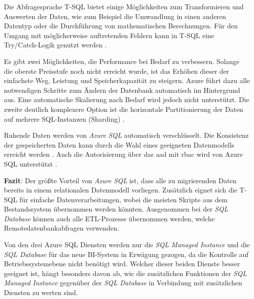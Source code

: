 Die Abfragesprache T-SQL bietet einige Möglichkeiten zum Transformieren und Auswerten der Daten, wie zum Beispiel die Umwandlung in einen anderen Datentyp oder die Durchführung von mathematischen Berechnungen. Für den Umgang mit möglicherweise auftretenden Fehlern kann in T-SQL eine Try/Catch-Logik genutzt werden \cite[vgl.][]{kellenberger_beginning_2021}.

Es gibt zwei Möglichkeiten, die Performance bei Bedarf zu verbessern. Solange die oberste Preisstufe noch nicht erreicht wurde, ist das Erhöhen dieser der einfachste Weg, Leistung und Speicherkapazität zu steigern. Azure führt dazu alle notwendigen Schritte zum Ändern der Datenbank automatisch im Hintergrund aus. Eine automatische Skalierung nach Bedarf wird jedoch nicht unterstützt. Die zweite deutlich komplexere Option ist die horizontale Partitionierung der Daten auf mehrere SQL-Instanzen (Sharding) \cite{reagan_web_2018}.

Ruhende Daten werden von \textit{Azure SQL} automatisch verschlüsselt. Die Konsistenz der gespeicherten Daten kann durch die Wahl eines geeigneten Datenmodells erreicht werden \cite{reagan_web_2018}. Auch die Autorisierung über das \ac{aad} mit \ac{rbac} wird von Azure SQL unterstützt \cite{wolter_authorize_2021}.

\textbf{Fazit}: Der größte Vorteil von \textit{Azure SQL} ist, dass alle zu migrierenden Daten bereits in einem relationalen Datenmodell vorliegen. Zusätzlich eignet sich die T-SQL für einfache Datenverarbeitungen, wobei die meisten Skripte aus dem Bestandssystem übernommen werden könnten. Ausgenommen bei der \textit{SQL Database} können auch alle ETL-Prozesse übernommen werden, welche Remotedatenbankabfragen verwenden.

Von den drei Azure SQL Diensten werden nur die \textit{SQL Managed Instance} und die \textit{SQL Database} für das neue BI-System in Erwägung gezogen, da die Kontrolle auf Betriebssystemebene nicht benötigt wird. Welcher dieser beiden Dienste besser geeignet ist, hängt besonders davon ab, wie die zusätzlichen Funktionen der \textit{SQL Managed Instance} gegenüber der \textit{SQL Database} in Verbindung mit zusätzlichen Diensten zu werten sind.


